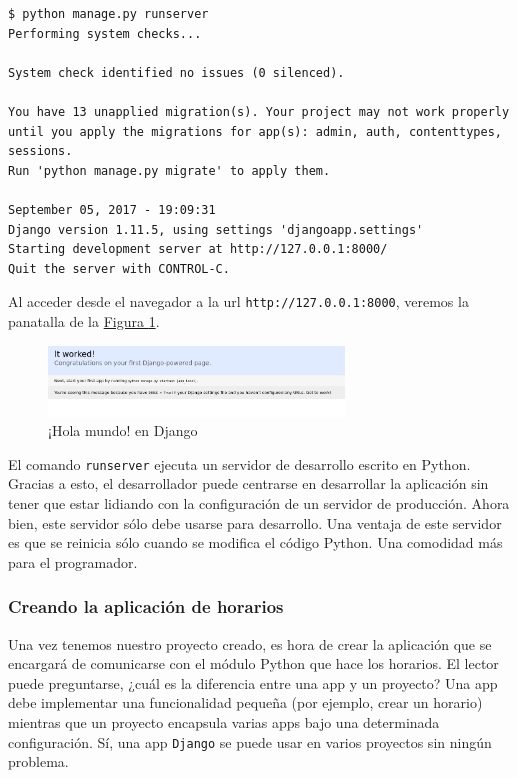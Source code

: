 \begin{verbatim}
$ python manage.py runserver
Performing system checks...

System check identified no issues (0 silenced).

You have 13 unapplied migration(s). Your project may not work properly until you apply the migrations for app(s): admin, auth, contenttypes, sessions.
Run 'python manage.py migrate' to apply them.

September 05, 2017 - 19:09:31
Django version 1.11.5, using settings 'djangoapp.settings'
Starting development server at http://127.0.0.1:8000/
Quit the server with CONTROL-C.
\end{verbatim}

Al acceder desde el navegador a la url \texttt{http://127.0.0.1:8000}, veremos la panatalla de la \hyperref[djangook]{Figura \ref*{djangook}}.

\begin{figure}
\centering
\includegraphics[width=0.7\textwidth]{img/djangook}
\caption{¡Hola mundo! en Django}
\label{djangook}
\end{figure}

El comando \texttt{runserver} ejecuta un servidor de desarrollo escrito en Python. Gracias a esto, el desarrollador puede centrarse en desarrollar la aplicación sin tener que estar lidiando con la configuración de un servidor de producción. Ahora bien, este servidor sólo debe usarse para desarrollo. Una ventaja de este servidor es que se reinicia sólo cuando se modifica el código Python. Una comodidad más para el programador.

\subsubsection{Creando la aplicación de horarios}
Una vez tenemos nuestro proyecto creado, es hora de crear la aplicación que se encargará de comunicarse con el módulo Python que hace los horarios. El lector puede preguntarse, ¿cuál es la diferencia entre una app y un proyecto? Una app debe implementar una funcionalidad pequeña (por ejemplo, crear un horario) mientras que un proyecto encapsula varias apps bajo una determinada configuración. Sí, una app \texttt{Django} se puede usar en varios proyectos sin ningún problema.

